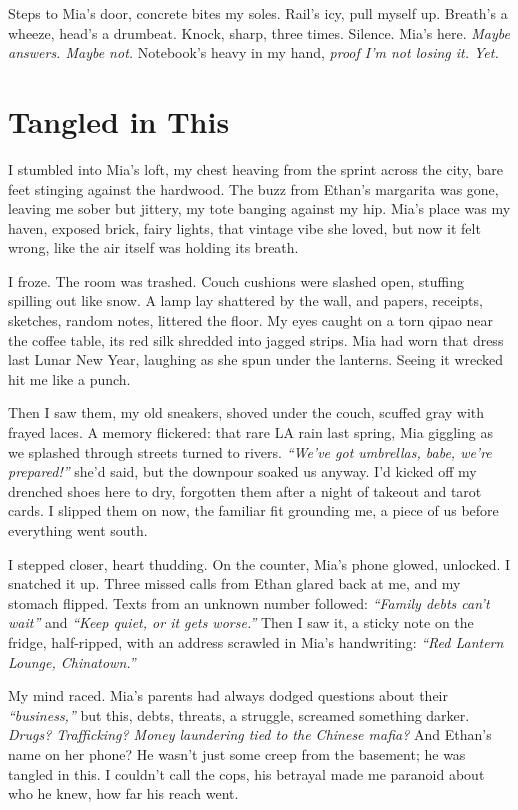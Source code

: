 \documentclass[12pt]{article}
\begin{document}
Steps to \textnormal{Mia}’s door, concrete bites my soles. Rail’s icy, pull myself up. Breath’s a wheeze, head’s a drumbeat. Knock, sharp, three times. Silence. \textnormal{Mia}’s here. \textit{Maybe answers. Maybe not.} Notebook’s heavy in my hand, \textit{proof I’m not losing it. Yet.}

\section{Tangled in This}

I stumbled into \textnormal{Mia}’s loft, my chest heaving from the sprint across the city, bare feet stinging against the hardwood. The buzz from \textnormal{Ethan}’s margarita was gone, leaving me sober but jittery, my tote banging against my hip. \textnormal{Mia}’s place was my haven, exposed brick, fairy lights, that vintage vibe she loved, but now it felt wrong, like the air itself was holding its breath.

I froze. The room was trashed. Couch cushions were slashed open, stuffing spilling out like snow. A lamp lay shattered by the wall, and papers, receipts, sketches, random notes, littered the floor. My eyes caught on a torn qipao near the coffee table, its red silk shredded into jagged strips. \textnormal{Mia} had worn that dress last Lunar New Year, laughing as she spun under the lanterns. Seeing it wrecked hit me like a punch.

Then I saw them, my old sneakers, shoved under the couch, scuffed gray with frayed laces. A memory flickered: that rare LA rain last spring, \textnormal{Mia} giggling as we splashed through streets turned to rivers. \textit{“We’ve got umbrellas, babe, we’re prepared!”} she’d said, but the downpour soaked us anyway. I’d kicked off my drenched shoes here to dry, forgotten them after a night of takeout and tarot cards. I slipped them on now, the familiar fit grounding me, a piece of us before everything went south.

I stepped closer, heart thudding. On the counter, \textnormal{Mia}’s phone glowed, unlocked. I snatched it up. Three missed calls from \textnormal{Ethan} glared back at me, and my stomach flipped. Texts from an unknown number followed: \textit{“Family debts can’t wait”} and \textit{“Keep quiet, or it gets worse.”} Then I saw it, a sticky note on the fridge, half-ripped, with an address scrawled in \textnormal{Mia}’s handwriting: \textit{“Red Lantern Lounge, Chinatown.”}

My mind raced. \textnormal{Mia}’s parents had always dodged questions about their \textit{“business,”} but this, debts, threats, a struggle, screamed something darker. \textit{Drugs? Trafficking? Money laundering tied to the Chinese mafia?} And \textnormal{Ethan}’s name on her phone? He wasn’t just some creep from the basement; he was tangled in this. I couldn’t call the cops, his betrayal made me paranoid about who he knew, how far his reach went.
\end{document}

